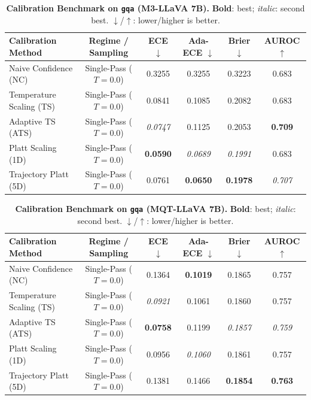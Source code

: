 \begin{table}[t]
\setlength{\tabcolsep}{4pt}
\renewcommand{\arraystretch}{1.05}
\centering
\footnotesize
\begin{tabular}{lccccc}
\toprule
\textbf{Calibration Method} & \textbf{Regime / Sampling} & \textbf{ECE} $\downarrow$ & \textbf{Ada-ECE} $\downarrow$ & \textbf{Brier} $\downarrow$ & \textbf{AUROC} $\uparrow$ \\
\midrule
Naive Confidence (NC) & Single-Pass ($T = 0.0$) & 0.3255 & 0.3255 & 0.3223 & 0.683 \\
Temperature Scaling (TS) & Single-Pass ($T = 0.0$) & 0.0841 & 0.1085 & 0.2082 & 0.683 \\
Adaptive TS (ATS) & Single-Pass ($T = 0.0$) & \textit{0.0747} & 0.1125 & 0.2053 & \textbf{0.709} \\
Platt Scaling (1D) & Single-Pass ($T = 0.0$) & \textbf{0.0590} & \textit{0.0689} & \textit{0.1991} & 0.683 \\
Trajectory Platt (5D) & Single-Pass ($T = 0.0$) & 0.0761 & \textbf{0.0650} & \textbf{0.1978} & \textit{0.707} \\
\bottomrule
\end{tabular}
\caption{\textbf{Calibration Benchmark on \texttt{gqa} (M3-LLaVA 7B).} \textbf{Bold}: best; \textit{italic}: second best. $\downarrow$/$\uparrow$: lower/higher is better.}
\label{tab:benchmark_m3_gqa}
\end{table}

\begin{table}[t]
\setlength{\tabcolsep}{4pt}
\renewcommand{\arraystretch}{1.05}
\centering
\footnotesize
\begin{tabular}{lccccc}
\toprule
\textbf{Calibration Method} & \textbf{Regime / Sampling} & \textbf{ECE} $\downarrow$ & \textbf{Ada-ECE} $\downarrow$ & \textbf{Brier} $\downarrow$ & \textbf{AUROC} $\uparrow$ \\
\midrule
Naive Confidence (NC) & Single-Pass ($T = 0.0$) & 0.1364 & \textbf{0.1019} & 0.1865 & 0.757 \\
Temperature Scaling (TS) & Single-Pass ($T = 0.0$) & \textit{0.0921} & 0.1061 & 0.1860 & 0.757 \\
Adaptive TS (ATS) & Single-Pass ($T = 0.0$) & \textbf{0.0758} & 0.1199 & \textit{0.1857} & \textit{0.759} \\
Platt Scaling (1D) & Single-Pass ($T = 0.0$) & 0.0956 & \textit{0.1060} & 0.1861 & 0.757 \\
Trajectory Platt (5D) & Single-Pass ($T = 0.0$) & 0.1381 & 0.1466 & \textbf{0.1854} & \textbf{0.763} \\
\bottomrule
\end{tabular}
\caption{\textbf{Calibration Benchmark on \texttt{gqa} (MQT-LLaVA 7B).} \textbf{Bold}: best; \textit{italic}: second best. $\downarrow$/$\uparrow$: lower/higher is better.}
\label{tab:benchmark_mqt_gqa}
\end{table}

